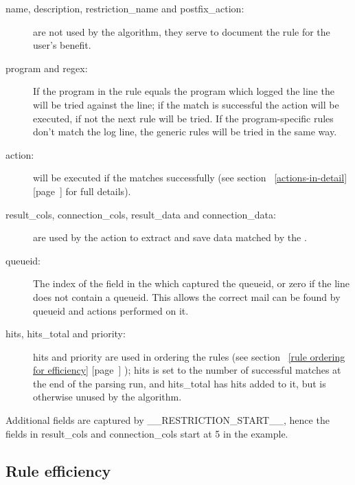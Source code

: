 \documentclass[a4paper,12pt,draft]{article}
\newcommand{\refwithpage}[1]{%
    \empty{}\ref{#1} [page~\pageref{#1}]%
}
\begin{document}
\begin{description}

    \item [name, description, restriction\_name and postfix\_action:] are
        not \newline used by the algorithm, they serve to document the rule
        for the user's benefit.

    \item [program and regex:] If the program in the rule equals the
        program which logged the line the \regex{} will be tried against
        the line; if the match is successful the action will be executed,
        if not the next rule will be tried.  If the program-specific rules
        don't match the log line, the generic rules will be tried in the
        same way.

    \item [action:] will be executed if the \regex{} matches successfully
        (see section~\refwithpage{actions-in-detail} for full details).

    \item [result\_cols, connection\_cols, result\_data and
        connection\_data:] are \newline used by the action to extract and
        save data matched by the \regex{}.

    \item [queueid:] The index of the field in the \regex{} which captured
        the queueid, or zero if the line does not contain a queueid.  This
        allows the correct mail can be found by queueid and actions
        performed on it.

    \item [hits, hits\_total and priority:] hits and priority are used in
        ordering the rules (see section~\refwithpage{rule ordering for
        efficiency}); hits is set to the number of successful matches at
        the end of the parsing run, and hits\_total has hits added to it,
        but is otherwise unused by the algorithm.

\end{description}

Additional fields are captured by \_\_RESTRICTION\_START\_\_, hence the
fields in result\_cols and connection\_cols start at 5 in the example.


\subsection{Rule efficiency}
\end{document}
